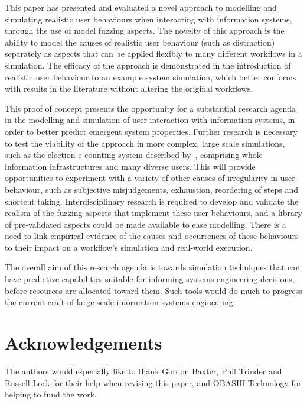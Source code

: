 \documentclass{llncs}
\begin{document}

This paper has presented and evaluated a novel approach to modelling and simulating realistic user behaviours when
interacting with information systems, through the use of model fuzzing aspects. The novelty of this approach is the
ability to model the causes of realistic user behaviour (such as distraction) separately as aspects that can
be applied flexibly to many different workflows in a simulation. The efficacy of the approach is
demonstrated in the introduction of realistic user behaviour to an example system simulation, which better conforms with
results in the literature without altering the original workflows.

This proof of concept presents the opportunity for a substantial research agenda in the modelling and simulation of user
interaction with information systems, in order to better predict emergent system properties. Further research is
necessary to test the viability of the approach in more complex, large scale simulations, such as
the election e-counting system described by~\citet{lock07observations}, comprising whole information infrastructures and
many diverse users. This will provide opportunities to experiment with a variety of other causes of
irregularity in user behaviour, such as subjective misjudgements, exhaustion, reordering of steps and shortcut taking.
Interdisciplinary research is required to develop and validate the realism of the fuzzing aspects that implement these
user behaviours, and a library of pre-validated aspects could be made available to ease modelling. There is a need to
link empirical evidence of the causes and occurrences of these behaviours to their impact on a workflow's simulation and
real-world execution.

The overall aim of this research agenda is towards simulation techniques that can have predictive capabilities suitable
for informing systems engineering decisions, before resources are allocated toward them. Such tools would do much to
progress the current craft of large scale information systems engineering.

\section*{Acknowledgements}
The authors would especially like to thank Gordon Baxter, Phil Trinder and Russell Lock for their help when revising
this paper, and OBASHI Technology for helping to fund the work.






\end{document}
